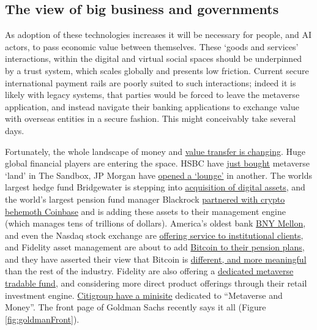 \subsection{The view of big business and governments}
As adoption of these technologies increases it will be necessary for people, and AI actors, to pass economic value between themselves. These `goods and services' interactions, within the digital and virtual social spaces should be underpinned by a trust system, which scales globally and presents low friction. Current secure international payment rails are poorly suited to such interactions; indeed it is likely with legacy systems, that parties would be forced to leave the metaverse application, and instead navigate their banking applications to exchange value with overseas entities in a secure fashion. This might conceivably take several days.\par 
Fortunately, the whole landscape of money and \href{https://www.omfif.org/futureofpayments2021/}{value transfer is changing}. Huge global financial players are entering the space. HSBC have \href{https://sandboxgame.medium.com/hsbc-to-become-the-first-global-financial-services-provider-to-enter-the-sandbox-c066e4f48163}{just bought} metaverse `land' in The Sandbox, JP Morgan have \href{https://www.forbes.com/sites/ronshevlin/2022/02/16/jpmorgan-opens-a-bank-branch-in-the-metaverse-but-its-not-for-what-you-think-its-for/?sh=2fbd1e90158d}{opened a `lounge'} in another. The worlds largest hedge fund Bridgewater is stepping into \href{https://uk.finance.yahoo.com/news/bitcoin-latest-price-crypto-ray-dalio-bridgewater-investment-fund-ethereum-094946686.html}{acquisition of digital assets}, and the world's largest pension fund manager Blackrock \href{https://blog.coinbase.com/coinbase-selected-by-blackrock-provide-aladdin-clients-access-to-crypto-trading-and-custody-via-b9e7144f313d}{partnered with crypto behemoth Coinbase} and is adding these assets to their management engine (which manages tens of trillions of dollars). America's oldest bank \href{https://www.bnymellon.com/emea/en/about-us/newsroom/press-release/bny-mellon-launches-new-digital-asset-custody-platform-130305.html}{BNY Mellon}, and even the Nasdaq stock exchange are \href{https://www.nasdaq.com/articles/nasdaq-to-launch-institutional-bitcoin-crypto-custody-services\%3A-report}{offering service to institutional clients}, and Fidelity asset management are about to add \href{https://www.wsj.com/articles/fidelity-weighs-bitcoin-trading-on-brokerage-platform-11663008698}{Bitcoin to their pension plans}, and they have asserted their view that Bitcoin is \href{https://www.fidelitydigitalassets.com/sites/default/files/documents/bitcoin-first.pdf}{different, and more meaningful} than the rest of the industry. Fidelity are also offering a \href{}{dedicated metaverse tradable fund}, and considering more direct product offerings through their retail investment engine. \href{https://www.citivelocity.com/citigps/metaverse-and-money/}{Citigroup have a minisite} dedicated to ``Metaverse and Money''. The front page of Goldman Sachs recently says it all (Figure \ref{fig:goldmanFront}).\par
